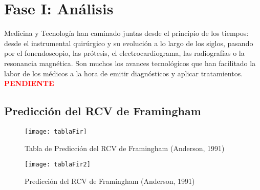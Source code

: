 \chapter {Fase I: Análisis}
\label{cap:Fase I. Análisis}

Medicina y Tecnología han caminado juntas desde el principio de los tiempos: desde el instrumental quirúrgico y su evolución a lo largo de los siglos, pasando por el fonendoscopio, las prótesis, el electrocardiograma, las radiografías o la resonancia magnética. Son muchos los avances tecnológicos que han facilitado la labor de los médicos a la hora de emitir diagnósticos y aplicar tratamientos.
\textbf{\textcolor{red}{\huge PENDIENTE}}


\section{Predicción del RCV de Framingham}

\begin{figure}[htb]
	\centering
	\texttt{[image: tablaFir]} 
	\caption[Tabla Framighan]{Tabla de Predicción del RCV de Framingham (Anderson, 1991) \cite{tagle2007estimacion}
	}
	\label{fig:tablaFir1}
\end{figure}

\begin{figure}[htb]
	\centering
	\texttt{[image: tablaFir2]} 
	\caption[Predicción Framighan]{Predicción del RCV de Framingham (Anderson, 1991) \cite{tagle2007estimacion}
	}
	\label{fig:tablaFir2}
\end{figure}